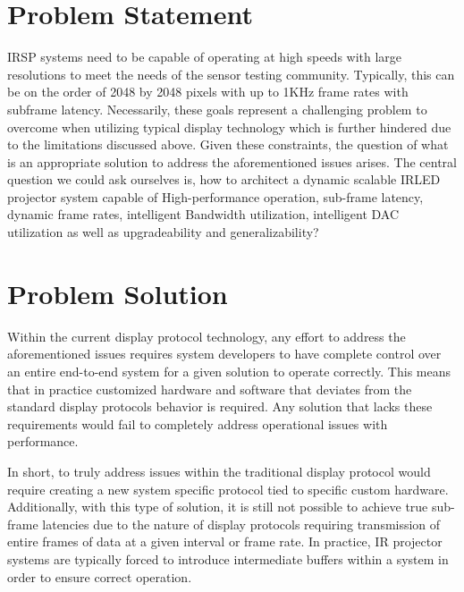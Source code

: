 \section{Problem Statement}
    IRSP systems need to be capable of operating at high speeds with large resolutions to meet the needs of the sensor testing community. Typically, this can be on the order of 2048 by 2048 pixels with up to 1KHz frame rates with subframe latency. Necessarily, these goals represent a challenging problem to overcome when utilizing typical display technology which is further hindered due to the limitations discussed above. Given these constraints, the question of what is an appropriate solution to address the aforementioned issues arises. The central question we could ask ourselves is, how to architect a dynamic scalable IRLED projector system capable of High-performance operation, sub-frame latency, dynamic frame rates, intelligent Bandwidth utilization, intelligent DAC utilization as well as upgradeability and generalizability?

\section{Problem Solution}
    Within the current display protocol technology, any effort to address the aforementioned issues requires system developers to have complete control over an entire end-to-end system for a given solution to operate correctly. This means that in practice customized hardware and software that deviates from the standard display protocols behavior is required. Any solution that lacks these requirements would fail to completely address operational issues with performance.

    In short, to truly address issues within the traditional display protocol would require creating a new system specific protocol tied to specific custom hardware. Additionally, with this type of solution, it is still not possible to achieve true sub-frame latencies due to the nature of display protocols requiring transmission of entire frames of data at a given interval or frame rate. In practice, IR projector systems are typically forced to introduce intermediate buffers within a system in order to ensure correct operation.

